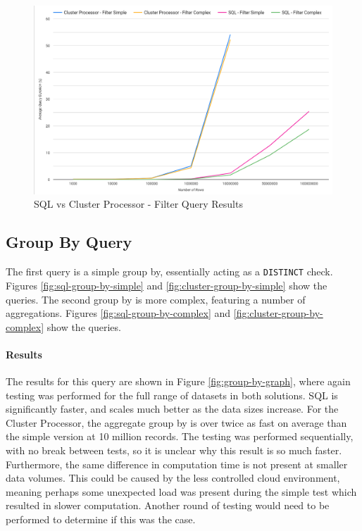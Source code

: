 \begin{figure}[htp]
	\centering
	\includegraphics[width=0.8\linewidth]{chapters/diagrams/testing/filter-1k-100m}
	\caption{SQL vs Cluster Processor - Filter Query Results} 
	\label{fig:filter-graph}
\end{figure}


\subsection{Group By Query}
The first query is a simple group by, essentially acting as a \texttt{DISTINCT} check. Figures \ref{fig:sql-group-by-simple} and \ref{fig:cluster-group-by-simple} show the queries. The second group by is more complex, featuring a number of aggregations. Figures \ref{fig:sql-group-by-complex} and \ref{fig:cluster-group-by-complex} show the queries. 

\paragraph{Results}
The results for this query are shown in Figure \ref{fig:group-by-graph}, where again testing was performed for the full range of datasets in both solutions. SQL is significantly faster, and scales much better as the data sizes increase. For the Cluster Processor, the aggregate group by is over twice as fast on average than the simple version at 10 million records. The testing was performed sequentially, with no break between tests, so it is unclear why this result is so much faster. Furthermore, the same difference in computation time is not present at smaller data volumes. This could be caused by the less controlled cloud environment, meaning perhaps some unexpected load was present during the simple test which resulted in slower computation. Another round of testing would need to be performed to determine if this was the case.

